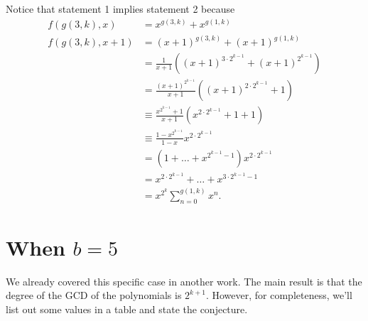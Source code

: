 \documentclass{article}
\begin{document}
	Notice that statement 1 implies statement 2 because
	\begin{align*}
		f(g(3,k),x) &= x^{g(3,k)} + x^{g(1,k)} \\
		f(g(3,k),x+1) &= (x+1)^{g(3,k)} + (x+1)^{g(1,k)} \\
		&= \frac{1}{x+1}\left((x+1)^{3\cdot2^{k-1}} + (x+1)^{2^{k-1}}\right) \\
		&= \frac{(x+1)^{2^{k-1}}}{x+1}\left((x+1)^{2\cdot2^{k-1}}+1\right) \\
		&\equiv \frac{x^{2^{k-1}}+1}{x+1}\left(x^{2\cdot2^{k-1}}+1+1\right) \\
		&\equiv \frac{1-x^{2^{k-1}}}{1-x}x^{2\cdot2^{k-1}} \\
		&= \left(1+\dots+x^{2^{k-1}-1}\right)x^{2\cdot2^{k-1}} \\
		&= x^{2\cdot2^{k-1}} + \dots + x^{3\cdot2^{k-1}-1} \\
		&= x^{2^k}\sum_{n=0}^{g(1,k)}{x^n}.
	\end{align*}

	\newpage
	\section{When $b = 5$}
	We already covered this specific case in another work.
	The main result is that the degree of the GCD of the polynomials is $2^{k+1}$.
	However, for completeness, we'll list out some values in a table and state the conjecture.
	
\end{document}
